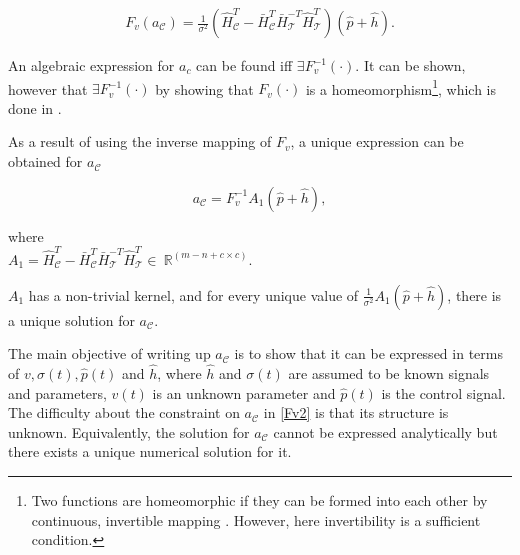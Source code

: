 \begin{equation}
\begin{split}
\label{Fv1}
F_v(a_{\mathcal{C}}) = \frac{1}{\sigma^2} (\hat{H}^T_{\mathcal{C}} -\bar{H}^T_{\mathcal{C}}\bar{H}^{-T}_{\mathcal{T}}\hat{H}^T_{\mathcal{T}})(\hat{p} + \hat{h}).
\end{split}
\end{equation}

An algebraic expression for $a_c$ can be found iff $\exists F_v^{-1}(\cdot)$. It can be shown, however that $\exists F_v^{-1}(\cdot)$ by showing that $F_v(\cdot)$ is a homeomorphism\footnote{Two functions are homeomorphic if they can be formed into each other by continuous, invertible mapping \cite{krantz2012handbook}. However, here invertibility is a sufficient condition.}, which is done in \cite{oneinput_paper}.  

As a result of using the inverse mapping of $F_v$, a unique expression can be obtained for $a_{\mathcal{C}}$

\begin{equation}
\label{Fv2}
a_{\mathcal{C}} = F_v^{-1} A_1(\hat{p} + \hat{h}),
\end{equation}

  \begin{minipage}[t]{0.60\textwidth}
where\\
\hspace*{8mm} $A_1 = \hat{H}^T_{\mathcal{C}} -\bar{H}^T_{\mathcal{C}}\bar{H}^{-T}_{\mathcal{T}}\hat{H}^T_{\mathcal{T}}\in \: \mathbb{R}^{(m-n+c \times c)}$. 
\end{minipage}

$A_1$ has a non-trivial kernel, and for every unique value of $\frac{1}{\sigma^2} A_1 (\hat{p}+\hat{h}) $, there is a unique solution for $a_{\mathcal{C}}$.


The main objective of writing up $a_{\mathcal{C}}$ is to show that it can be expressed in terms of $v, \sigma(t), \hat{p}(t)$ and $\hat{h}$, where $\hat{h}$ and $\sigma(t)$ are assumed to be known signals and parameters, $v(t)$ is an unknown parameter and $\hat{p}(t)$ is the control signal. The difficulty about the constraint on $a_{\mathcal{C}}$ in \eqref{Fv2} is that its structure is unknown. Equivalently, the solution for $a_{\mathcal{C}}$ cannot be expressed analytically but there exists a unique numerical solution for it.  

